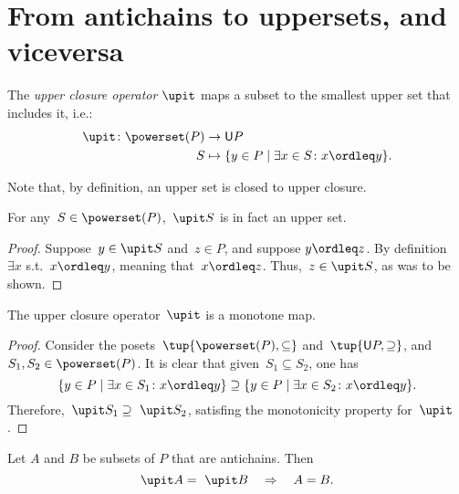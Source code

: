 \section{From antichains to uppersets, and viceversa}
\begin{definition}
    \label{def:upperclosure}
    The \emph{upper closure operator} $\upit $ maps a subset to the smallest upper set that includes it, i.e.:
    \begin{equation}
        \begin{aligned}
            \upit  \colon \powerset(P)&\to \mathsf{U}P\\
            S&\mapsto \{y\in P \mid \exists x\in S \colon x\ordleq y\}.
        \end{aligned}
    \end{equation}
\end{definition}
\begin{remark}
    Note that, by definition, an upper set is closed to upper closure.
\end{remark}
\begin{remark}
    For any~$S\in \powerset(P)$,~$\upit  S$ is in fact an upper set.
    \begin{proof}
        Suppose~$y\in \upit  S$ and~$z\in P$, and suppose $y\ordleq z$. By definition~$\exists x$ s.t.~$x\ordleq y$, meaning that~$x\ordleq z$. Thus,~$z\in \upit  S$, as was to be shown.
    \end{proof}
\end{remark}

\begin{lemma}
    The upper closure operator~$\upit $ is a monotone map.
\end{lemma}
\begin{proof}
    Consider the posets~$\tup{\powerset(P),\subseteq}$ and~$\tup{\mathsf{U}P,\supseteq}$, and~$S_1,S_2\in \powerset(P)$. It is clear that given~$S_1\subseteq S_2$, one has
    \begin{equation*}
        \{y\in P\mid \exists x\in S_1\colon x\ordleq y\} \supseteq \{y\in P\mid \exists x\in S_2\colon x\ordleq y\}.
    \end{equation*}
    Therefore,~$\upit  S_1\supseteq \ \upit  S_2$, satisfing the monotonicity property for~$\upit $.
\end{proof}

\begin{lemma}
    \label{up-cl-inj-antichains}
    Let $A$ and $B$ be subsets of $P$ that are antichains. Then
    \begin{equation*}
        \upit  A = \ \upit  B \quad \Rightarrow \quad A = B.
    \end{equation*}
\end{lemma}


